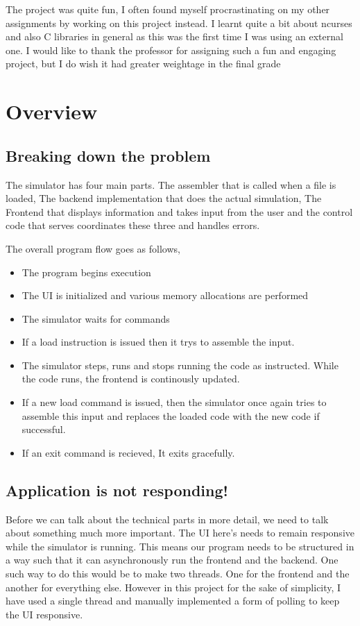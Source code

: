 \documentclass[12pt]{article}
\begin{document}
	The project was quite fun, I often found myself procrastinating on my other assignments by working on this project instead. I learnt quite a bit about ncurses and also C libraries in general as this was the first time I was using an external one. I would like to thank the professor for assigning such a fun and engaging project, but I do wish it had greater weightage in the final grade

	\section{Overview}

	\subsection{Breaking down the problem}

	The simulator has four main parts. The assembler that is called when a file is loaded, The backend implementation that does the actual simulation, The Frontend that displays information and takes input from the user and the control code that serves coordinates these three and handles errors.

	The overall program flow goes as follows,

	\begin{itemize}
		\item The program begins execution
		\item The UI is initialized and various memory allocations are performed
		\item The simulator waits for commands
		\item If a load instruction is issued then it trys to assemble the input.
		\item The simulator steps, runs and stops running the code as instructed. While the code runs, the frontend is continously updated.
		\item If a new load command is issued, then the simulator once again tries to assemble this input and replaces the loaded code with the new code if successful.
		\item If an exit command is recieved, It exits gracefully.
	\end{itemize}

	\subsection{Application is not responding!}

	Before we can talk about the technical parts in more detail, we need to talk about something much more important. The UI here's needs to remain responsive while the simulator is running. This means our program needs to be structured in a way such that it can asynchronously run the frontend and the backend. One such way to do this would be to make two threads. One for the frontend and the another for everything else. However in this project for the sake of simplicity, I have used a single thread and manually implemented a form of polling to keep the UI responsive.
\end{document}
